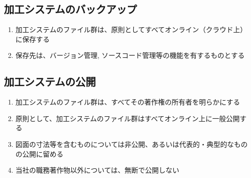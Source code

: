 \subsection{加工システムのバックアップ}
\begin{enumerate}[label*=\alph*)]
\item 加工システムのファイル群は、原則としてすべてオンライン（クラウド上）に保存する
\item 保存先は、バージョン管理, ソースコード管理等の機能を有するものとする
\end{enumerate}


\subsection{加工システムの公開}
\begin{enumerate}[label*=\alph*)]
\item 加工システムのファイル群は、すべてその著作権の所有者を明らかにする
\item 原則として、加工システムのファイル群はすべてオンライン上に一般公開する
\item 図面の寸法等を含むものについては非公開、あるいは代表的・典型的なものの公開に留める
\item 当社の職務著作物以外については、無断で公開しない
\end{enumerate}




